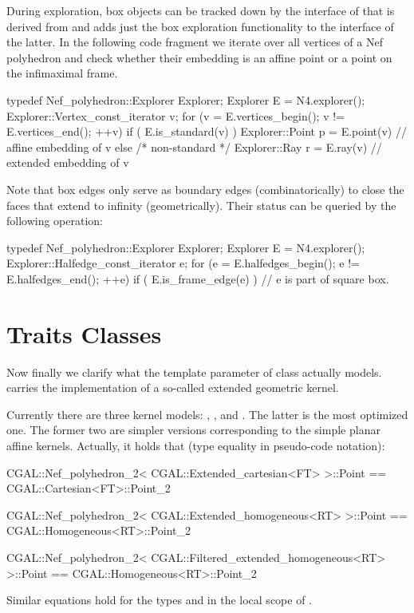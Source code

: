 During exploration, box objects can be tracked down by the interface
of  that is derived from
 and adds just the box
exploration functionality to the interface of the latter. In the
following code fragment we iterate over all vertices of a Nef
polyhedron and check whether their embedding is an affine point or a
point on the infimaximal frame.
\begin{ccExampleCode}
typedef Nef_polyhedron::Explorer Explorer;
Explorer E = N4.explorer();
Explorer::Vertex_const_iterator v;
for (v = E.vertices_begin(); v != E.vertices_end(); ++v)
  if ( E.is_standard(v) ) 
    Explorer::Point p = E.point(v) // affine embedding of v
  else /* non-standard */ 
    Explorer::Ray r = E.ray(v) // extended embedding of v
\end{ccExampleCode}

Note that box edges only serve as boundary edges (combinatorically) to
close the faces that extend to infinity (geometrically). Their status
can be queried by the following operation:
\begin{ccExampleCode}
typedef Nef_polyhedron::Explorer Explorer;
Explorer E = N4.explorer();
Explorer::Halfedge_const_iterator e;
for (e = E.halfedges_begin(); e != E.halfedges_end(); ++e)
  if ( E.is_frame_edge(e) ) // e is part of square box.
\end{ccExampleCode}

\section{Traits Classes}

Now finally we clarify what the template parameter of class
 actually models.  carries the
implementation of a so-called extended geometric kernel.

Currently there are three kernel models:
,
, and
. The latter is the most
optimized one. The former two are simpler versions corresponding to
the simple planar affine kernels.  Actually, it holds that (type
equality in pseudo-code notation):
\begin{ccExampleCode}
CGAL::Nef_polyhedron_2< CGAL::Extended_cartesian<FT> >::Point 
  == CGAL::Cartesian<FT>::Point_2

CGAL::Nef_polyhedron_2< CGAL::Extended_homogeneous<RT> >::Point
   == CGAL::Homogeneous<RT>::Point_2

CGAL::Nef_polyhedron_2< CGAL::Filtered_extended_homogeneous<RT> >::Point
   == CGAL::Homogeneous<RT>::Point_2
\end{ccExampleCode}
Similar equations hold for the types  and  in
the local scope of .

